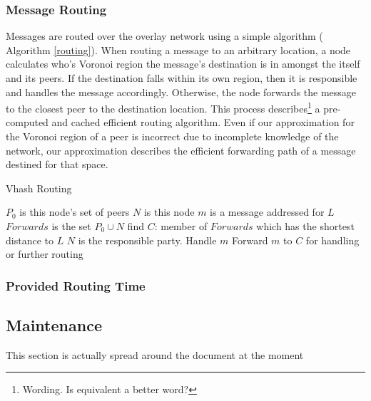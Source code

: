 \documentclass{IEEEtran}
\begin{document}
\subsubsection{Message Routing}
Messages are routed over the overlay network using a simple algorithm ( Algorithm \ref{routing}). 
When routing a message to an arbitrary location, a node calculates who's Voronoi region the message's destination is in amongst the itself and its peers. If the destination falls within its own region, then it is responsible and handles the message accordingly. Otherwise, the node forwards the message to the closest peer to the destination location. This process describes\footnote{Wording.  Is equivalent a better word?} a pre-computed and cached efficient routing algorithm. Even if our approximation for the Voronoi region of a peer is incorrect due to incomplete knowledge of the network, our approximation describes the efficient forwarding path of a message destined for that space.

\begin{algorithm}
\caption{Vhash Routing}
\label{routing}
\begin{algorithmic}[1]  %
	\STATE $P_0$ is this node's set of peers
    \STATE $N$ is this node
	\STATE $m$ is a message addressed for $L$
    \STATE $Forwards$ is the set $P_0\cup{}N$
    \STATE find $C$: member of $Forwards$ which has the shortest distance to $L$
    	\STATE $N$ is the responsible party.
        \STATE Handle $m$
    \ELSE
    	\STATE Forward $m$ to $C$ for handling or further routing
    \ENDIF
\end{algorithmic}
\end{algorithm}


\subsubsection{Provided Routing Time}



\subsection{Maintenance}
This section is actually spread around the document at the moment 
\end{document}
